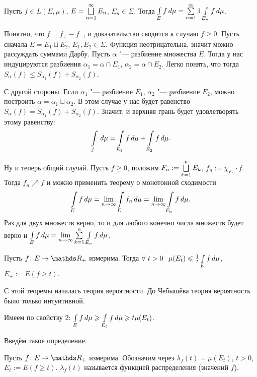 \begin{The}
  Пусть $f\in L(E,\mu)$, $E=\bigsqcup\limits_{n=1}^\infty E_n$, $E_n\in\Sigma$. Тогда $\Gint Ef\,d\mu \hm= \rY n1\Gint {E_n}f\,d\mu$.
\end{The}

\begin{Proof}
  Понятно, что $f= f_+-f_-$, и доказательство сводится к случаю $f\ge0$. Пусть сначала $E=E_1\sqcup E_2$, $E_1,E_2\in\Sigma$. Функция неотрицательна, значит можно рассуждать суммами Дарбу. Пусть $\alpha$ "--- разбиение множества $E$. Тогда у нас индуцируются разбиения $\alpha_1 = \alpha\cap E_1$, $\alpha_2 = \alpha\cap E_2$. Легко понять, что тогда $S_\alpha(f)\le S_{\alpha_1}(f)+S_{\alpha_2}(f)$.

 С другой стороны. Если $\alpha_1$ "--- разбиение $E_1$, $\alpha_2$ "--- разбиение $E_2$, можно построить $\alpha = \alpha_1\sqcup \alpha_2$. В этом случае у нас будет равенство $S_\alpha(f) = S_{\alpha_1}(f)+S_{\alpha_2}(f)$. Значит, и верхняя грань будет удовлетворять этому равенству:
\[
  \int\limits_{f}\,d\mu = \int\limits_{E_1}f\,d\mu +\int\limits_{E_2}f\,d\mu.
\]

Ну и теперь общий случай. Пусть $f\ge 0$, положим $F_n:=\bigsqcup\limits_{k=1}^{n} E_k$, $f_n:=\chi_{F_n}\cdot f$. Тогда $f_n\nearrow f$ и можно применить теорему о монотонной сходимости
\[
  \int\limits_{E} f\,d\mu= \lim\limits_{n\rightarrow\infty} \int\limits_{E}f_n\,d\mu = \lim\limits_{n\rightarrow\infty} \int\limits_{F_n}f\,d\mu.
\]
Раз для двух множеств верно, то и для любого конечно числа множеств будет верно и $\int\limits_{E} f\,d\mu = \lim\limits_{n\rightarrow\infty} \sum\limits_{k = 1}^{n}\int\limits_{E_n}f\,d\mu$.
\end{Proof}

\begin{The}
 Пусть $f\colon E\to\R_+$ измерима. Тогда $\forall\ t>0\pau \mu(E_t)\le \frac1t\Gint Ef\,d\mu$, $E_+:= E(f\ge t)$.
\end{The}
С этой теоремы началась теория вероятности. До Чебышёва теория вероятность было только интуитивной.

\begin{Proof}
  Имеем по свойству 2: $\int\limits_{E}f\,d\mu\geqslant \int\limits_{E_t}f\,d\mu\geqslant t\mu(E_t)$.
\end{Proof}

Введём такое определение.
\begin{Def}
  Пусть $f\colon E\to \R_+$ измерима. Обозначим через $\lambda_f(t) = \mu(E_t)$, $t>0$, $E_t:=E(f\ge t)$. $\lambda_f(t)$ называется функцией распределения (значений $f$).
\end{Def}

